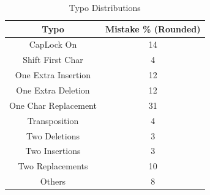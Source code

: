 \begin{center}
\begin{table}[h]

	\begin{tabular}{|c|c|}
		\hline
		Typo            &  Mistake \% (Rounded) \\ \hline
		CapLock On           & 14                            \\ \hline
		Shift First Char     & 4                             \\ \hline
		One Extra Insertion  & 12                            \\ \hline
		One Extra Deletion   & 12                            \\ \hline
		One Char Replacement & 31                            \\ \hline
		Transposition        & 4                             \\ \hline
		Two Deletions         & 3                             \\ \hline
		Two Insertions        & 3                             \\ \hline
		Two Replacements      & 10                            \\ \hline
		Others               & 8                             \\ \hline
	\end{tabular}

	\caption{Typo Distributions\cite{CCS:CWPCR17}}
	\label{Table:TypoTypes}
	\vspace{-0.5cm}
\end{table}	\end{center}
\vspace*{-\baselineskip}
\vspace*{-\baselineskip}
\vspace*{-\baselineskip}
\vspace*{-\baselineskip}
\vspace*{-\baselineskip}
